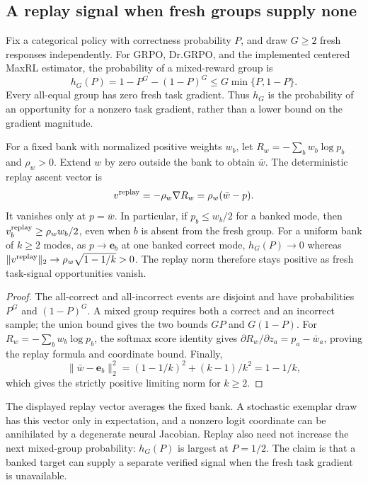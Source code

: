 \subsection{A replay signal when fresh groups supply none}
\label{app:theory-gradient-availability}

\begin{lemma}
\label{lem:replay-gradient-availability}
Fix a categorical policy with correctness probability $P$, and draw $G\ge2$
fresh responses independently. For GRPO, Dr.GRPO, and the implemented centered
MaxRL estimator, the probability of a mixed-reward group is
\[
 h_G(P)=1-P^G-(1-P)^G\le G\min\{P,1-P\}.
\]
Every all-equal group has zero fresh task gradient. Thus $h_G$ is the
probability of an opportunity for a nonzero task gradient, rather than a
lower bound on the gradient magnitude.

For a fixed bank with normalized positive weights $w_b$, let
$R_w=-\sum_b w_b\log p_b$ and $\rho_w>0$. Extend $w$ by zero outside the
bank to obtain $\bar w$. The deterministic replay ascent vector is
\[
 v^{\rm replay}=-\rho_w\nabla R_w=\rho_w(\bar w-p).
\]
It vanishes only at $p=\bar w$. In particular, if $p_b\le w_b/2$ for a banked
mode, then $v^{\rm replay}_b\ge\rho_w w_b/2$, even when $b$ is absent from the
fresh group. For a uniform bank of $k\ge2$ modes, as $p\to\mathbf e_b$ at
one banked correct mode, $h_G(P)\to0$ whereas
$\|v^{\rm replay}\|_2\to\rho_w\sqrt{1-1/k}>0$.
The replay norm therefore stays positive as fresh task-signal opportunities vanish.
\end{lemma}

\begin{proof}
The all-correct and all-incorrect events are disjoint and have probabilities
$P^G$ and $(1-P)^G$. A mixed group requires both a correct and an incorrect
sample; the union bound gives the two bounds $GP$ and $G(1-P)$.
For $R_w=-\sum_b w_b\log p_b$, the softmax score identity gives
$\partial R_w/\partial z_a=p_a-\bar w_a$, proving the replay formula and
coordinate bound. Finally,
\[
 \|\bar w-\mathbf e_b\|_2^2=(1-1/k)^2+(k-1)/k^2=1-1/k,
\]
which gives the strictly positive limiting norm for $k\ge2$.
\end{proof}


The displayed replay vector averages the fixed bank. A stochastic exemplar
draw has this vector only in expectation, and a nonzero logit coordinate can
be annihilated by a degenerate neural Jacobian. Replay also need not increase
the next mixed-group probability: $h_G(P)$ is largest at $P=1/2$. The claim
is that a banked target can supply a separate verified signal when the fresh
task gradient is unavailable.

